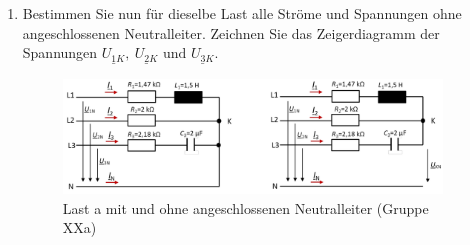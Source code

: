 \begin{enumerate}[label=\alph*)]
	
	
\item Bestimmen Sie nun für dieselbe Last alle Ströme und Spannungen ohne angeschlossenen Neutralleiter. Zeichnen Sie das Zeigerdiagramm der Spannungen $\underline{U_{1K}},\ \underline{U_{2K}} \text{ und } \underline{U_{3K}}$. 
  \begin{figure}[h!]
    \begin{center}
      \includegraphics[width=0.95\textwidth]{img/img2.6.1.png}
    \end{center}
    \caption{Last a mit und ohne angeschlossenen Neutralleiter (Gruppe XXa)}\label{img2.6.1}
  \end{figure}
  
\end{enumerate}
